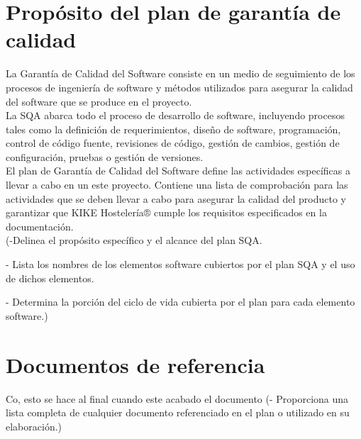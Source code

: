\documentclass[spanish,a4paper,11pt, twoside]{report}	%
\begin{document}
\newpage
\mbox{}
\thispagestyle{empty}						%
\newpage


\tableofcontents 							%

\newpage
\mbox{}
\thispagestyle{empty}						%
\newpage



\chapter{ Propósito del plan de garantía de calidad}


 La Garantía de Calidad del Software consiste en un medio de seguimiento de los procesos de ingeniería de software y métodos utilizados para asegurar la calidad del software que se produce en el proyecto.\\

La SQA abarca todo el proceso de desarrollo de software, incluyendo procesos tales como la definición de requerimientos, diseño de software, programación, control de código fuente, revisiones de código, gestión de cambios, gestión de configuración, pruebas o gestión de versiones.\\

El plan de Garantía de Calidad del Software define las actividades específicas a llevar a cabo en un este proyecto. Contiene una lista de comprobación para las actividades que se deben llevar a cabo para asegurar la calidad del producto y garantizar que KIKE Hostelería® cumple los requisitos especificados en la documentación.\\
		
	(-Delinea el propósito específico y el alcance del plan	SQA.

	- Lista los nombres de los elementos software cubiertos por el plan SQA y el uso de dichos elementos.
		
	- Determina la porción del ciclo de vida cubierta por el plan para cada elemento software.)

\newpage
\mbox{}
\thispagestyle{empty}						%
\newpage

\chapter{ Documentos de referencia}
	Co, esto se hace al final cuando este acabado el documento
	(- Proporciona una lista completa de cualquier documento referenciado en el plan o utilizado en su elaboración.)
\end{document}
